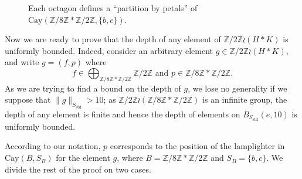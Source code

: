 \documentclass[reqno,oneside]{amsart}
\newcommand{\cay}[2]{\mathrm{Cay}(#1,#2)}
\newcommand{\Z}{\mathbb{Z}}
\newcommand{\std}{S_{\mathrm{std}}}
\theoremstyle{plain}
\theoremstyle{definition}
\begin{document}
\begin{figure*}[h!]
	\centering
	
	\caption{Each octagon defines a ``partition by petals'' of $\cay{\Z/8\Z*\Z/2\Z}{ \{b,c\}}$.}
	\label{fig: partition by petals Z/8Z*Z/2Z}
\end{figure*}

Now we are ready to prove that the depth of any element of $\Z/2\Z\wr (H*K)$ is uniformly bounded. Indeed, consider an arbitrary element $g\in \Z/2\Z\wr (H* K)$, and write $g=(f,p)$ where $$f\in \bigoplus_{\Z/8\Z*\Z/2\Z}\Z/2\Z \text{ and } p\in \Z/8\Z*\Z/2\Z.$$
As we are trying to find a bound on the depth of $g$, we lose no generality if we suppose that $\|g\|_{\std}>10$; as $\Z/2\Z\wr (\Z/8\Z*\Z/2\Z)$ is an infinite group, the depth of any element is finite and hence the depth of elements on $B_{\std}(e,10)$ is uniformly bounded.

According to our notation, $p$ corresponds to the position of the lamplighter in $\cay{B}{S_B}$ for the element $g$, where $B=\Z/8\Z*\Z/2\Z$ and $S_B=\{b,c\}$. We divide the rest of the proof on two cases.
\end{document}
